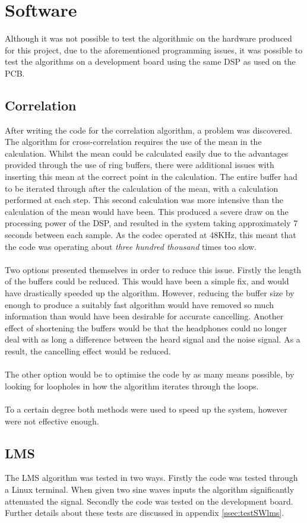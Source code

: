 \section{Software}

Although it was not possible to test the algorithmic on the hardware produced for this project, due to the aforementioned programming issues, it was possible to test the algorithms on a development board using the same DSP as used on the PCB.

\subsection{Correlation}
After writing the code for the correlation algorithm, a problem was discovered.
The algorithm for cross-correlation requires the use of the mean in the calculation.
Whilst the mean could be calculated easily due to the advantages provided through the use of ring buffers, there were additional issues with inserting this mean at the correct point in the calculation.
The entire buffer had to be iterated through after the calculation of the mean, with a calculation performed at each step.
This second calculation was more intensive than the calculation of the mean would have been.
This produced a severe draw on the processing power of the DSP, and resulted in the system taking approximately 7 seconds between each sample.
As the codec operated at 48KHz, this meant that the code was operating about \emph{three hundred thousand} times too slow.
\\
\\
Two options presented themselves in order to reduce this issue.
Firstly the length of the buffers could be reduced.
This would have been a simple fix, and would have drastically speeded up the algorithm.
However, reducing the buffer size by enough to produce a suitably fast algorithm would have removed so much information than would have been desirable for accurate cancelling.
Another effect of shortening the buffers would be that the headphones could no longer deal with as long a difference between the heard signal and the noise signal.
As a result, the cancelling effect would be reduced.
\\
\\
The other option would be to optimise the code by as many means possible, by looking for loopholes in how the algorithm iterates through the loops.
\\
\\
To a certain degree both methods were used to speed up the system, however were not effective enough.

\subsection{LMS}

The LMS algorithm was tested in two ways.
Firstly the code was tested through a Linux terminal.
When given two sine waves inputs the algorithm significantly attenuated the signal.
Secondly the code was tested on the development board.
Further details about these tests are discussed in appendix \ref{ssec:testSWlms}.
